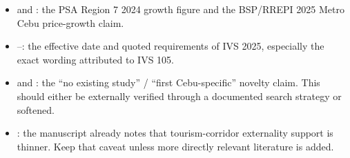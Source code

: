 \documentclass[11pt]{article}
\begin{document}
\begin{itemize}
\item {} and : the PSA Region 7 2024 growth figure and the BSP/RREPI 2025 Metro Cebu price-growth claim.
\item {}--: the effective date and quoted requirements of IVS 2025, especially the exact wording attributed to IVS 105.
\item {} and : the ``no existing study'' / ``first Cebu-specific'' novelty claim. This should either be externally verified through a documented search strategy or softened.
\item {}: the manuscript already notes that tourism-corridor externality support is thinner. Keep that caveat unless more directly relevant literature is added.
\end{itemize}
\end{document}
